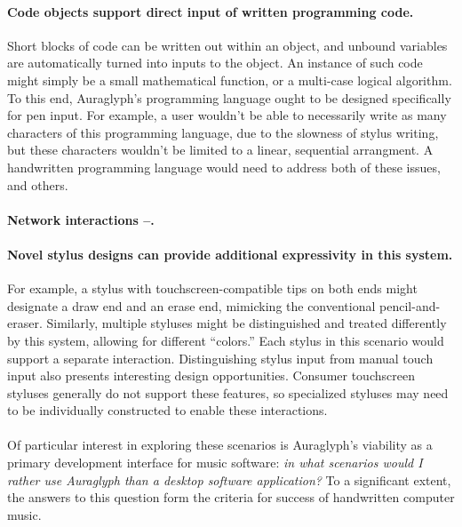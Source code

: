 \documentclass[10pt,letterpaper]{article}
\begin{document}
\paragraph{Code objects support direct input of written programming code.} 
Short blocks of code can be written out within an object, and unbound variables are automatically turned into inputs to the object. 
An instance of such code might simply be a small mathematical function, or a multi-case logical algorithm. 
To this end, Auraglyph's programming language ought to be designed specifically for pen input. 
For example, a user wouldn't be able to necessarily write as many characters of this programming language, due to the slowness of stylus writing, but these characters wouldn't be limited to a linear, sequential arrangment. 
A handwritten programming language would need to address both of these issues, and others. 

\paragraph{Network interactions --.} 

\paragraph{Novel stylus designs can provide additional expressivity in this system.}
For example, a stylus with touchscreen-compatible tips on both ends might designate a draw end and an erase end, mimicking the conventional pencil-and-eraser. 
Similarly, multiple styluses might be distinguished and treated differently by this system, allowing for different ``colors.''
Each stylus in this scenario would support a separate interaction. 
Distinguishing stylus input from manual touch input also presents interesting design opportunities. 
Consumer touchscreen styluses generally do not support these features, so specialized styluses may need to be individually constructed to enable these interactions. 

\paragraph{}
Of particular interest in exploring these scenarios is Auraglyph's viability as a primary development interface for music software: \emph{in what scenarios would I rather use Auraglyph than a desktop software application?}
To a significant extent, the answers to this question form the criteria for success of handwritten computer music. 
\end{document}
